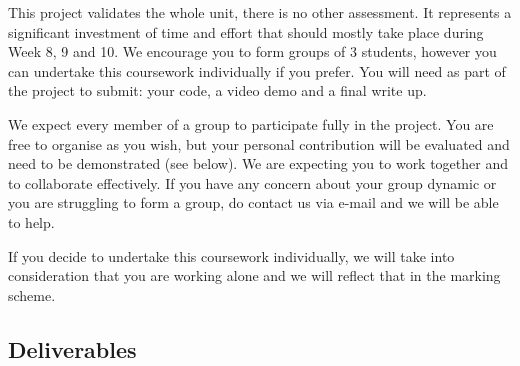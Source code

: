 \documentclass{article}
\begin{document}
This project validates the whole unit, there is no other
assessment. It represents a significant investment of time and effort
that should mostly take place during Week 8, 9 and 10. We encourage
you to form groups of 3 students, however you can undertake this
coursework individually if you prefer. You will need as part of the
project to submit: your code, a video demo and a final write up.

We expect every member of a group to participate fully in the project.
You are free to organise as you wish, but your personal contribution
will be evaluated and need to be demonstrated (see below). We are
expecting you to work together and to collaborate effectively. If you
have any concern about your group dynamic or you are struggling to
form a group, do contact us via e-mail and we will be able to help.

If you decide to undertake this coursework individually, we will take
into consideration that you are working alone and we will reflect that
in the marking scheme.

\subsection*{Deliverables}
\end{document}
